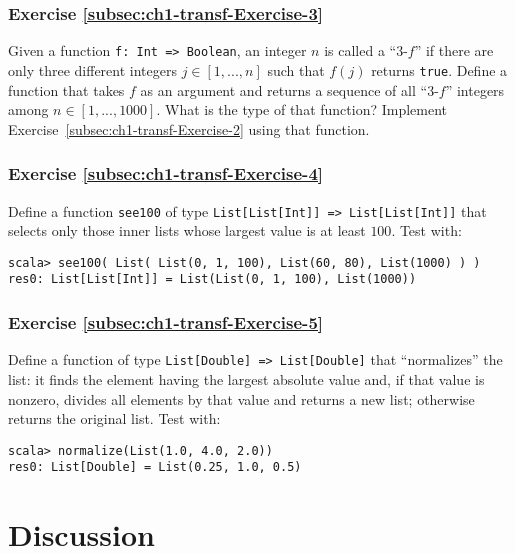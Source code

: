 \subsubsection{Exercise \label{subsec:ch1-transf-Exercise-3}\ref{subsec:ch1-transf-Exercise-3}}

Given a function \lstinline!f: Int => Boolean!, an integer $n$ is
called a \textsf{``}$3$-$f$\textsf{''} if there are only three different integers
$j\in[1,...,n]$ such that $f(j)$ returns \lstinline!true!. Define
a function that takes $f$ as an argument and returns a sequence of
all \textsf{``}$3$-$f$\textsf{''} integers among $n\in[1,...,1000]$. What is the
type of that function? Implement Exercise~\ref{subsec:ch1-transf-Exercise-2}
using that function.

\subsubsection{Exercise \label{subsec:ch1-transf-Exercise-4}\ref{subsec:ch1-transf-Exercise-4}}

Define a function \lstinline!see100! of type \texttt{}\lstinline!List[List[Int]] => List[List[Int]]!
that selects only those inner lists whose largest value is at least
$100$. Test with:
\begin{lstlisting}
scala> see100( List( List(0, 1, 100), List(60, 80), List(1000) ) )
res0: List[List[Int]] = List(List(0, 1, 100), List(1000))
\end{lstlisting}


\subsubsection{Exercise \label{subsec:ch1-transf-Exercise-5}\ref{subsec:ch1-transf-Exercise-5}}

Define a function of type \texttt{}\lstinline!List[Double] => List[Double]!
that \textsf{``}normalizes\textsf{''} the list: it finds the element having the largest
absolute value and, if that value is nonzero, divides all elements
by that value and returns a new list; otherwise returns the original
list. Test with:
\begin{lstlisting}
scala> normalize(List(1.0, 4.0, 2.0))
res0: List[Double] = List(0.25, 1.0, 0.5)
\end{lstlisting}


\section{Discussion}

